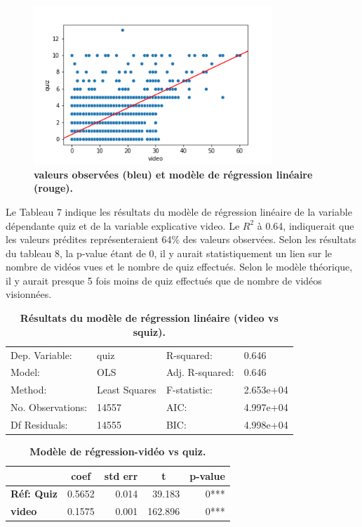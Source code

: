 \documentclass[12pt, a4paper, titlepage, table]{article}
\begin{document}
\begin{figure}[H]
	\centering
	\includegraphics[width=0.8\textwidth]{../../graph/scatter2_regression.png}
	\caption{\textbf{valeurs observées (bleu) et modèle de régression linéaire (rouge).}}
\end{figure}

Le Tableau 7 indique les résultats du modèle de régression linéaire de la variable dépendante quiz et de la variable explicative video. Le $R^2$ à 0.64, indiquerait que les valeurs prédites représenteraient 64\% des valeurs observées. 
Selon les résultats du tableau 8, la p-value étant de 0, il y aurait statistiquement un lien sur le nombre de vidéos vues et le nombre de quiz effectués. Selon le modèle théorique, il y aurait presque 5 fois moins de quiz effectués que de nombre de vidéos visionnées.

\begin{table}[H]
	\centering
	\fontsize{12}{20}\selectfont
	\begin{tabular}{|ll|ll|}
		\hline
			Dep. Variable:&	quiz&	R-squared:&	0.646\\
			Model:&	OLS&	Adj. R-squared:&	0.646\\
			Method:&	Least Squares&	F-statistic:&	2.653e+04\\
			No. Observations:&	14557&	AIC:&	4.997e+04\\
			Df Residuals:&	14555&	BIC:&	4.998e+04\\
		\hline
	\end{tabular}
\caption{\textbf{Résultats du modèle de régression linéaire (video vs squiz).}}
\end{table}
	
	
\begin{table}[H]
	\centering
	\fontsize{12}{20}\selectfont
	\begin{tabular}{|l|r|r|r|r|}
		\hline
			\multicolumn{1}{|c|}{\textbf{}}&
			\multicolumn{1}{c|}{\textbf{coef}}&
			\multicolumn{1}{c|}{\textbf{std err}}&
			\multicolumn{1}{c|}{\textbf{t}}&
			\multicolumn{1}{c|}{\textbf{p-value}}\\	
		\hline
		\textbf{Réf: Quiz}&	0.5652&	0.014&	39.183&	0***\\
		\textbf{video}&	0.1575&	0.001&	162.896&	0***\\
		\hline
\end{tabular}
\caption{\textbf{Modèle de régression-vidéo vs quiz.}}
\end{table}
\end{document}
